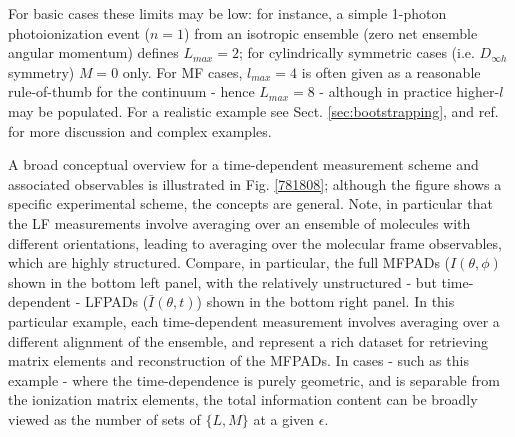 \documentclass[10pt]{article}
\begin{document}
For basic cases these limits may be low: for instance, a simple 1-photon photoionization event ($n=1$) from an isotropic ensemble (zero net ensemble angular momentum) defines $L_{max}=2$; for cylindrically symmetric cases (i.e. $D_{\infty h}$ symmetry) $M=0$ only. For MF cases, $l_{max}=4$ is often given as a reasonable rule-of-thumb for the continuum - hence $L_{max}=8$ - although in practice higher-$l$ may be populated. For a realistic example see Sect. \ref{sec:bootstrapping}, and ref. \cite{hockett2018QMP1} for more discussion and complex examples.

A broad conceptual overview for a time-dependent measurement scheme and associated observables is illustrated in Fig. \ref{781808}; although the figure shows a specific experimental scheme, the concepts are general. Note, in particular that the LF measurements involve averaging over an ensemble of molecules with different orientations, leading to averaging over the molecular frame observables, which are highly structured. Compare, in particular, the full MFPADs ($I(\theta,\phi)$ shown in the bottom left panel, with the relatively unstructured - but time-dependent - LFPADs ($\bar{I}(\theta,t)$) shown in the bottom right panel. In this particular example, each time-dependent measurement involves averaging over a different alignment of the ensemble, and represent a rich dataset for retrieving matrix elements and reconstruction of the MFPADs. In cases - such as this example - where the time-dependence is purely geometric, and is separable from the ionization matrix elements, the total information content can be broadly viewed as the number of sets of $\{L,M\}$ at a given $\epsilon$.


\end{document}
